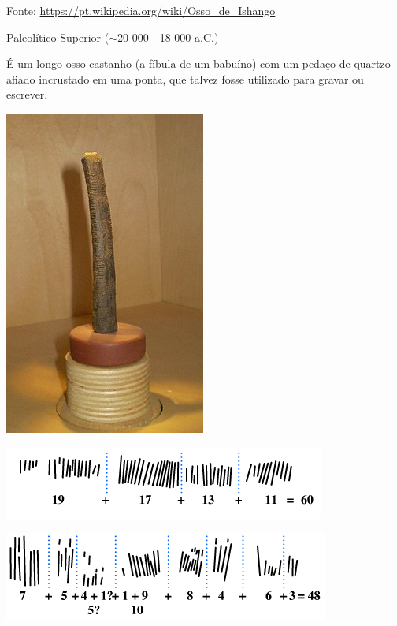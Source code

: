 
\begin{multicols}{2}
	{\normalsize Fonte: \href{https://pt.wikipedia.org/wiki/Osso_de_Ishango}{https://pt.wikipedia.org/wiki/Osso\_de\_Ishango}}
	
	{\large Paleolítico Superior ($\sim$20 000 - 18 000 a.C.)
	
	É um longo osso castanho (a fíbula de um babuíno) com um pedaço de quartzo afiado incrustado em uma ponta, que talvez fosse utilizado para gravar ou escrever.
}
\vfill\null
\columnbreak	

	\begin{center}
		\includegraphics[height=.75\textheight]{./IMG/Os_d'Ishango_IRSNB.JPG}
	\end{center}


\begin{center}
	\includegraphics[width=\linewidth]{./IMG/IshangoColumnA.png}

	\includegraphics[width=\linewidth]{./IMG/IshangoColumnB.png}


\end{center}
\end{multicols}
